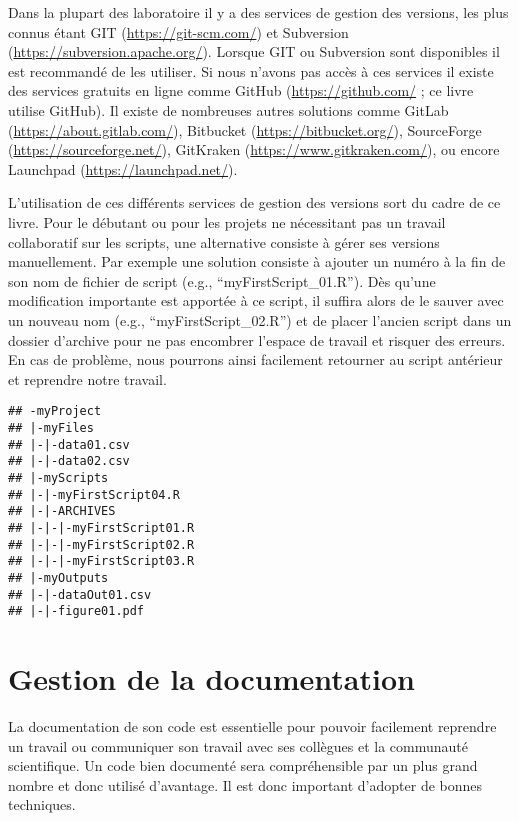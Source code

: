 \documentclass[]{book}
\theoremstyle{definition}
\theoremstyle{definition}
\theoremstyle{definition}
\theoremstyle{remark}
\begin{document}
Dans la plupart des laboratoire il y a des services de gestion des
versions, les plus connus étant GIT (\url{https://git-scm.com/}) et
Subversion (\url{https://subversion.apache.org/}). Lorsque GIT ou
Subversion sont disponibles il est recommandé de les utiliser. Si nous
n'avons pas accès à ces services il existe des services gratuits en
ligne comme GitHub (\url{https://github.com/} ; ce livre utilise
GitHub). Il existe de nombreuses autres solutions comme GitLab
(\url{https://about.gitlab.com/}), Bitbucket
(\url{https://bitbucket.org/}), SourceForge
(\url{https://sourceforge.net/}), GitKraken
(\url{https://www.gitkraken.com/}), ou encore Launchpad
(\url{https://launchpad.net/}).

L'utilisation de ces différents services de gestion des versions sort du
cadre de ce livre. Pour le débutant ou pour les projets ne nécessitant
pas un travail collaboratif sur les scripts, une alternative consiste à
gérer ses versions manuellement. Par exemple une solution consiste à
ajouter un numéro à la fin de son nom de fichier de script (e.g.,
``myFirstScript\_01.R''). Dès qu'une modification importante est
apportée à ce script, il suffira alors de le sauver avec un nouveau nom
(e.g., ``myFirstScript\_02.R'') et de placer l'ancien script dans un
dossier d'archive pour ne pas encombrer l'espace de travail et risquer
des erreurs. En cas de problème, nous pourrons ainsi facilement
retourner au script antérieur et reprendre notre travail.

\begin{verbatim}
## -myProject
## |-myFiles
## |-|-data01.csv
## |-|-data02.csv
## |-myScripts
## |-|-myFirstScript04.R
## |-|-ARCHIVES
## |-|-|-myFirstScript01.R
## |-|-|-myFirstScript02.R
## |-|-|-myFirstScript03.R
## |-myOutputs
## |-|-dataOut01.csv
## |-|-figure01.pdf
\end{verbatim}

\section{Gestion de la documentation}\label{gestion-de-la-documentation}

La documentation de son code est essentielle pour pouvoir facilement
reprendre un travail ou communiquer son travail avec ses collègues et la
communauté scientifique. Un code bien documenté sera compréhensible par
un plus grand nombre et donc utilisé d'avantage. Il est donc important
d'adopter de bonnes techniques.
\end{document}
